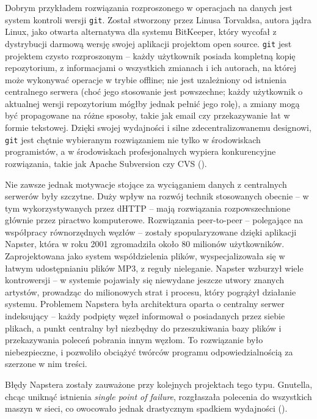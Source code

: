 Dobrym przykładem rozwiązania rozproszonego w operacjach na danych jest system kontroli wersji \texttt{git}.
Został stworzony przez Linusa Torvaldsa, autora jądra Linux, jako otwarta alternatywa dla systemu BitKeeper, który wycofał z dystrybucji darmową wersję swojej aplikacji projektom open source.
\texttt{git} jest projektem czysto rozproszonym -- każdy użytkownik posiada kompletną kopię repozytorium, z informacjami o wszystkich zmianach i ich autorach, na której może wykonywać operacje w trybie offline; nie jest uzależniony od istnienia centralnego serwera (choć jego stosowanie jest powszechne; każdy użytkownik o aktualnej wersji repozytorium mógłby jednak pełnić jego rolę), a zmiany mogą być propagowane na różne sposoby, takie jak email czy przekazywanie łat w formie tekstowej. Dzięki swojej wydajności i silne zdecentralizowanemu designowi, \texttt{git} jest chętnie wybieranym rozwiązaniem nie tylko w środowiskach programistów, a w środowiskach profesjonalnych wypiera konkurencyjne rozwiązania, takie jak Apache Subversion czy CVS (\cite{ram2013git}).

Nie zawsze jednak motywacje stojące za wyciąganiem danych z centralnych serwerów były szczytne. Duży wpływ na rozwój technik stosowanych obecnie -- w tym wykorzystywanych przez dHTTP -- mają rozwiązania rozpowszechnione głównie przez piractwo komputerowe. Rozwiązania peer-to-peer -- polegające na współpracy równorzędnych węzłów -- zostały spopularyzowane dzięki aplikacji Napster, która w roku 2001 zgromadziła około 80 milionów użytkowników. Zaprojektowana jako system współdzielenia plików, wyspecjalizowała się w łatwym udostępnianiu plików MP3, z reguły nieleganie. Napster wzburzył wiele kontrowersji -- w systemie pojawiały się niewydane jeszcze utwory znanych artystów, prowadząc do milionowych strat i procesu, który pogrążył działanie systemu.
Problemem Napstera była architektura oparta o centralny serwer indeksujący -- każdy podpięty węzeł informował o posiadanych przez siebie plikach, a punkt centralny był niezbędny do przeszukiwania bazy plików i przekazywania poleceń pobrania innym węzłom. To rozwiązanie było niebezpieczne, i pozwoliło obciążyć twórców programu odpowiedzialnością za szerzone w nim treści.

Błędy Napstera zostały zauważone przy kolejnych projektach tego typu. Gnutella, chcąc uniknąć istnienia {\em single point of failure}, rozgłaszała polecenia do wszystkich maszyn w sieci, co owocowało jednak drastycznym spadkiem wydajności (\cite{measuringNapsterGnutella}).


